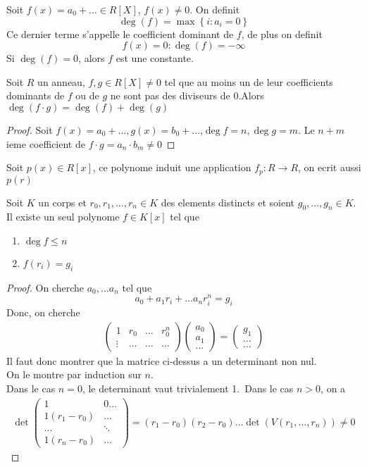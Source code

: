 \documentclass[../main.tex]{subfiles}
\begin{document}
\begin{defn}\label{defn:Degre d'un polynomedegre_d_un_polynome}
	Soit $f( x) = a_0 + \ldots \in R[X]$, $f( x) \neq 0$. On definit
\[ 
	\deg( f) = \max \left\{ i: a_i=0 \right\} 
\]
Ce dernier terme s'appelle le coefficient dominant de $f$, de plus on definit
\[ 
	f( x) =0: \deg( f) = - \infty 
\]
Si $\deg(f) =0$, alors $f$ est une constante.
\end{defn}
\begin{thm}
	Soit $R$ un anneau, $f,g \in R[X] \neq 0$ tel que au moins un de leur coefficients dominants de $f$ ou de $g$ ne sont pas des diviseurs  de 0.Alors $\deg( f\cdot g) = \deg( f) + \deg(  g )$
\end{thm}
\begin{proof}
	Soit $f( x) = a_0 + \ldots, g( x) = b_0 + \ldots$,$\deg f = n, \deg g = m$. Le $n+m$ ieme coefficient de $f\cdot g = a_n \cdot b_m \neq 0$
\end{proof}
Soit $p( x) \in R[x]$, ce polynome induit une application $f_p:R \to R$, on ecrit aussi $p( r) $
\begin{thm}
Soit $K$ un corps et $r_0,r_1,\ldots,r_n \in K$ des elements distincts et soient $g_0,\ldots,g_n \in K$.\\
Il existe un seul polynome $f\in K[x]$ tel que
\begin{enumerate}
\item $\deg f \leq n$ 
\item $f( r_i) = g_i$
\end{enumerate}

\end{thm}
\begin{proof}
On cherche $a_0,\ldots a_n$ tel que
\[ 
a_0 + a_1r_i + \ldots a_n r_i^{n}=g_i
\]
Donc, on cherche
\begin{align*}
\begin{pmatrix}
	1 & r_0 &\ldots & r_0^{n}\\
	\vdots & \ldots & \ldots & \ldots
\end{pmatrix}
\begin{pmatrix}
a_0\\
a_1\\
\ldots
\end{pmatrix}
= \begin{pmatrix}
g_1\\
\ldots\\
\ldots
\end{pmatrix}
\end{align*}
Il faut donc montrer que la matrice ci-dessus a un determinant non nul.\\
On le montre par induction sur $n$.\\
Dans le cas $n=0$, le determinant vaut trivialement 1.\
Dans le cas $n>0$, on a
\begin{align*}
	\det
\begin{pmatrix}
	1 & 0 \ldots\\
	1(r_1-r_0) & \ldots\\
	\ldots & \ddots\\
	1( r_n-r_0) & \ldots
\end{pmatrix}
= ( r_1-r_0) ( r_2-r_0)   \ldots \det( V( r_1, \ldots, r_n) ) \neq 0
\end{align*}
\end{proof}
\end{document}
